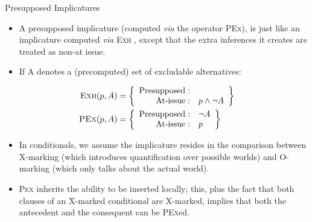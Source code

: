 \documentclass[10pt]{beamer}
\begin{document}
\begin{frame}{Presupposed Implicatures \cite{Bassi2021}}
	\begin{itemize}
		\item A presupposed implicature (computed \textit{via} the operator \textsc{PEx}), is just like an implicature computed \textit{via} \textsc{Exh} \cite{Fox2007,Chierchia2012}, except that the extra inferences it creates are treated as non-at issue.
		\item If A denotes a (precomputed) set of excludable alternatives:
	\end{itemize}
	\begin{footnotesize}
		\begin{align*}
			\textsc{Exh}(p, A) &= \left\lbrace\begin{array}{rl}
				\text{Presupposed}: & \\
				\text{At-issue}: & p \wedge \neg A\\
			\end{array} \right\rbrace\\
			\textsc{PEx}(p, A) &= \left\lbrace\begin{array}{rl}
				\text{Presupposed}: & \neg A\\
				\text{At-issue}: & p \\
			\end{array} \right\rbrace
		\end{align*}
	\end{footnotesize}
	
	\begin{itemize}
		\item In conditionals, we assume the implicature resides in the comparison between X-marking (which introduces quantification over possible worlds) and O-marking (which only talks about the actual world).
		\item \textsc{Pex} inherits the ability  to be inserted locally; this, plus the fact that both clauses of an X-marked conditional are X-marked, implies that both the antecedent and the consequent can be \textsc{PEx}ed.
	\end{itemize}
\end{frame}
\end{document}

